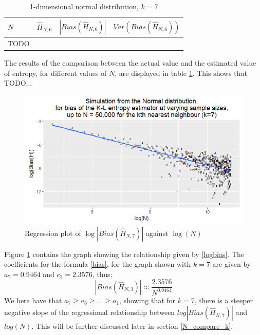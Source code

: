\documentclass{article}
\begin{document}
\begin{table}
\caption{1-dimensional normal distribution, $k=7$} \label{normal_k=7_table}
\begin{center}
\begin{tabular}{| l | c c c|} 
\toprule
$N$ & $\hat{H}_{N, 6}$ & $|Bias(\hat{H}_{N, 6})|$ & $Var(Bias(\hat{H}_{N, 6}))$ \\
\midrule[1pt]
TODO & & & \\
\hline
\end{tabular}
\end{center}
\end{table}

The results of the comparison between the actual value and the estimated value of entropy, for different values of $N$, are displayed in table \ref{normal_k=7_table}. This shows that TODO...

\begin{figure}
  \begin{center}
    \includegraphics[width=\textwidth]{./Graphs/new_normal_k=7.png}
  \end{center}
\caption{Regression plot of $\log|Bias(\hat{H}_{N, 7})|$ against $\log(N)$}
  \label{normal_k=7_graph}
\end{figure}

Figure \ref{normal_k=7_graph} contains the graph showing the relationship given by \ref{logbias}. The coefficients for the formula \ref{bias}, for the graph shown with $k=7$ are given by $a_{7} = 0.9464$ and $c_{3} = 2.3576$, thus;
\begin{equation}
|Bias(\hat{H}_{N, 3})| \approx \frac{2.3576}{N^{0.9464}} \nonumber
\end{equation}
We here have that $a_{7} \geq a_{6} \geq ... \geq a_{1}$, showing that for $k=7$, there is a steeper negative slope of the regressional relationship between $log|Bias(\hat{H}_{N,7})|$ and $log(N)$. This will be further discussed later in section \ref{N_compare_k}.
\end{document}
